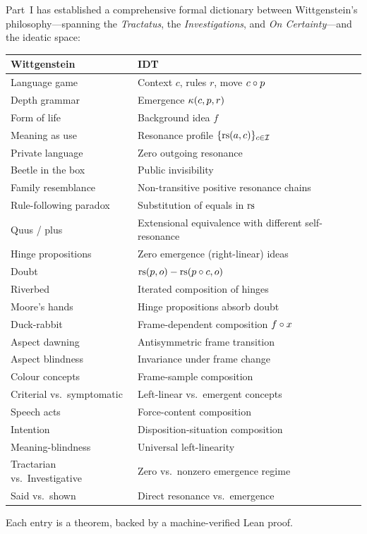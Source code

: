 \begin{remark}
Part~I has established a comprehensive formal dictionary between
Wittgenstein's philosophy---spanning the \textit{Tractatus}, the
\textit{Investigations}, and \textit{On Certainty}---and the ideatic space:
\begin{center}
\begin{tabular}{ll}
\textbf{Wittgenstein} & \textbf{IDT} \\
\hline
Language game & Context $c$, rules $r$, move $c \circ p$ \\
Depth grammar & Emergence $\kappa(c, p, r)$ \\
Form of life & Background idea $f$ \\
Meaning as use & Resonance profile $\{\mathrm{rs}(a,c)\}_{c \in \mathcal{I}}$ \\
Private language & Zero outgoing resonance \\
Beetle in the box & Public invisibility \\
Family resemblance & Non-transitive positive resonance chains \\
Rule-following paradox & Substitution of equals in $\mathrm{rs}$ \\
Quus / plus & Extensional equivalence with different self-resonance \\
Hinge propositions & Zero emergence (right-linear) ideas \\
Doubt & $\mathrm{rs}(p, o) - \mathrm{rs}(p \circ c, o)$ \\
Riverbed & Iterated composition of hinges \\
Moore's hands & Hinge propositions absorb doubt \\
Duck-rabbit & Frame-dependent composition $f \circ x$ \\
Aspect dawning & Antisymmetric frame transition \\
Aspect blindness & Invariance under frame change \\
Colour concepts & Frame-sample composition \\
Criterial vs.\ symptomatic & Left-linear vs.\ emergent concepts \\
Speech acts & Force-content composition \\
Intention & Disposition-situation composition \\
Meaning-blindness & Universal left-linearity \\
Tractarian vs.\ Investigative & Zero vs.\ nonzero emergence regime \\
Said vs.\ shown & Direct resonance vs.\ emergence \\
\end{tabular}
\end{center}
Each entry is a theorem, backed by a machine-verified Lean proof.
\end{remark}

